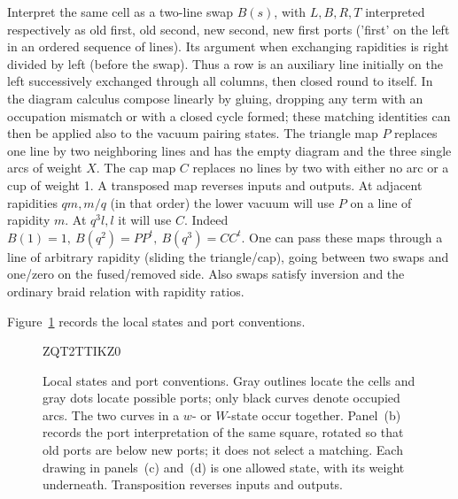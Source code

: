 \documentclass[11pt]{article}
\numberwithin{equation}{section}
\theoremstyle{definition}\newtheorem{definition}[theorem]{Definition}
\theoremstyle{remark}\newtheorem{remark}[theorem]{Remark}
\begin{document}
Interpret the same cell as a two-line swap \(B(s)\), with \(L,B,R,T\) interpreted respectively as old first, old second, new second, new first ports ('first' on the left in an ordered sequence of lines). Its argument when exchanging rapidities is right divided by left (before the swap). Thus a row is an auxiliary line initially on the left successively exchanged through all columns, then closed round to itself. In the diagram calculus compose linearly by gluing, dropping any term with an occupation mismatch or with a closed cycle formed; these matching identities can then be applied also to the vacuum pairing states. The triangle map \(P\) replaces one line by two neighboring lines and has the empty diagram and the three single arcs of weight \(X\). The cap map \(C\) replaces no lines by two with either no arc or a cup of weight 1. A transposed map reverses inputs and outputs. At adjacent rapidities \(q m,m/q\) (in that order) the lower vacuum will use \(P\) on a line of rapidity \(m\). At \(q^3 l,l\) it will use \(C\). Indeed \(B(1)=1,\ B(q^2)=P P^t,\ B(q^3)=CC^t\). One can pass these maps through a line of arbitrary rapidity (sliding the triangle/cap), going between two swaps and one/zero on the fused/removed side. Also swaps satisfy inversion and the ordinary braid relation with rapidity ratios.

Figure~\ref{L:fig:local-states} records the local states and port conventions.
\begin{figure}[tbp]

\begingroup
\newcommand{\FiniteSquare}[3]{
  \begin{scope}[shift={(#1,#2)}]
    \draw[finite boundary] (-.35,-.35) rectangle (.35,.35);
    #3
    \foreach \p in {(-.35,0),(0,-.35),(.35,0),(0,.35)}
      \fill[black!45] \p circle (1pt);
  \end{scope}}
\newcommand{\FiniteTriangle}[3]{
  \begin{scope}[shift={(#1,#2)}]
    \draw[finite boundary] (-.48,-.33)--(.48,-.33)--(0,.51)--cycle;
    #3
    \foreach \p in {(0,-.33),(-.24,.09),(.24,.09)}
      \fill[black!45] \p circle (1pt);
  \end{scope}}
\newcommand{\FiniteCap}[3]{
  \begin{scope}[shift={(#1,#2)}]
    \draw[finite boundary] (-.48,.22)--(-.48,-.35)--(.48,-.35)--(.48,.22);
    #3
    \foreach \p in {(-.30,.22),(.30,.22)}
      \fill[black!45] \p circle (1pt);
  \end{scope}}
ZQT2TTIKZ0
\endgroup
\caption{Local states and port conventions. Gray outlines locate the cells
and gray dots locate possible ports; only black curves denote occupied
arcs. The two curves in a $w$- or $W$-state occur together. Panel~(b)
records the port interpretation of the same square, rotated so that old
ports are below new ports; it does not select a matching. Each drawing in
panels~(c) and~(d) is one allowed state, with its weight underneath.
Transposition reverses inputs and outputs.}
\label{L:fig:local-states}
\end{figure}
\end{document}
